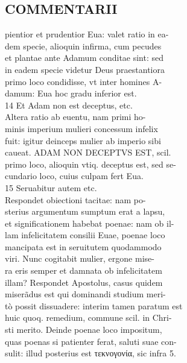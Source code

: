 \documentclass{article}
\begin{document}
\begin{pages}
\section*{COMMENTARII \\
                }pientior et prudentior Eua: valet ratio in ea- \\
                dem specie, alioquin infirma, cum pecudes \\
                et plantae ante Adamum conditae sint: sed \\
                in eadem specie videtur Deus praestantiora \\
                primo loco condidisse, vt inter homines A- \\
                damum: Eua hoc gradu inferior est. \\
                14 Et Adam non est deceptus, etc. \\
                Altera ratio ab euentu, nam primi ho- \\
                minis imperium mulieri concessum infelix \\
                fuit: igitur deinceps mulier ab imperio sibi \\
                caueat. ADAM NON DECEPTVS EST, scil. \\
                primo loco, alioquin vtiq. deceptus est, sed se- \\
                cundario loco, cuius culpam fert Eua. \\
                15 Seruabitur autem etc. \\
                Respondet obiectioni tacitae: nam po- \\
                sterius argumentum sumptum erat a lapsu, \\
                et significationem habebat poenae: nam ob il- \\
                lam infelicitatem consilii Euae, poenae loco \\
                mancipata est in seruitutem quodammodo \\
                viri. Nunc cogitabit mulier, ergone mise- \\
                ra eris semper et damnata ob infelicitatem \\
                illam? Respondet Apostolus, casus quidem \\
                miserãdus est qui dominandi studium meri- \\
                tò possit dissuadere: interim tamen paratum est \\
                huic quoq. remedium, commune scil. in Chri- \\
                sti merito. Deinde poenae loco impositum, \\
                quas poenas si patienter ferat, saluti suae con- \\
                sulit: illud posterius est τεκνογονία, sic infra 5. \\
                

\end{pages}
\end{document}
